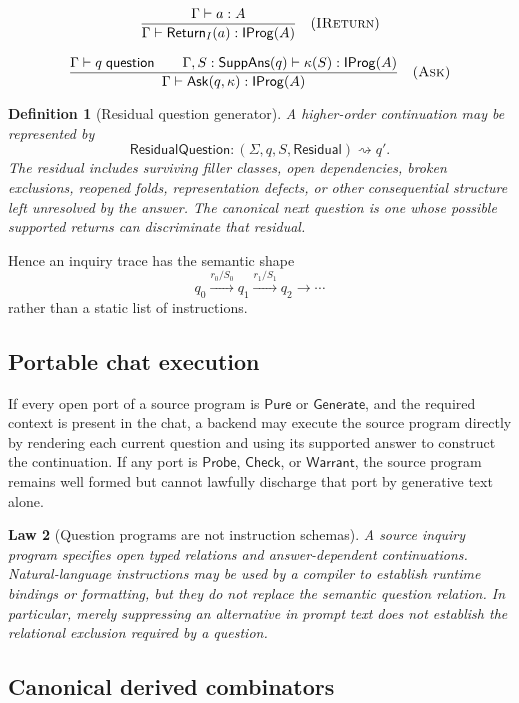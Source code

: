 \documentclass[11pt,oneside]{article}
\newtheorem{definition}{Definition}[section]
\newtheorem{law}[definition]{Law}
\begin{document}
\[
\frac{\Gamma\vdash a:A}
{\Gamma\vdash\mathsf{Return}_I(a):\mathsf{IProg}(A)}
\quad(\textsc{IReturn})
\]

\[
\frac{
\Gamma\vdash q\;\mathsf{question}
\qquad
\Gamma,S:\mathsf{SuppAns}(q)\vdash\kappa(S):\mathsf{IProg}(A)
}{
\Gamma\vdash\mathsf{Ask}(q,\kappa):\mathsf{IProg}(A)
}
\quad(\textsc{Ask})
\]

\begin{definition}[Residual question generator]
A higher-order continuation may be represented by
\[
\boxed{
\mathsf{ResidualQuestion}:
(\Sigma,q,S,\mathsf{Residual})
\rightsquigarrow
q'.
}
\]
The residual includes surviving filler classes, open dependencies, broken exclusions, reopened folds, representation defects, or other consequential structure left unresolved by the answer.  The canonical next question is one whose possible supported returns can discriminate that residual.
\end{definition}

Hence an inquiry trace has the semantic shape
\[
\boxed{
q_0\xrightarrow{r_0/S_0}q_1\xrightarrow{r_1/S_1}q_2\xrightarrow{}\cdots
}
\]
rather than a static list of instructions.

\subsection{Portable chat execution}

If every open port of a source program is \(\mathsf{Pure}\) or \(\mathsf{Generate}\), and the required context is present in the chat, a backend may execute the source program directly by rendering each current question and using its supported answer to construct the continuation.  If any port is \(\mathsf{Probe}\), \(\mathsf{Check}\), or \(\mathsf{Warrant}\), the source program remains well formed but cannot lawfully discharge that port by generative text alone.

\begin{law}[Question programs are not instruction schemas]
A source inquiry program specifies open typed relations and answer-dependent continuations.  Natural-language instructions may be used by a compiler to establish runtime bindings or formatting, but they do not replace the semantic question relation.  In particular, merely suppressing an alternative in prompt text does not establish the relational exclusion required by a question.
\end{law}

\subsection{Canonical derived combinators}
\end{document}
